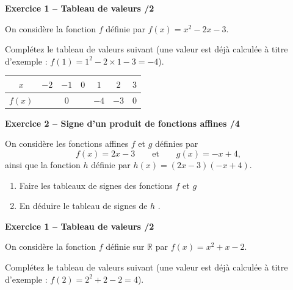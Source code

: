 \documentclass[10pt,a4paper]{article}
\begin{document}



\textbf{Exercice 1 -- Tableau de valeurs \hfill /2}

On considère la fonction \(f\) définie  par \(f(x)=x^2-2x-3\).

Complétez le tableau de valeurs suivant (une valeur est déjà calculée à titre d'exemple : \(f(1)=1^2-2\times 1-3=-4\)).

\begin{center}
    \renewcommand{\arraystretch}{1.5}
    \setlength{\tabcolsep}{0.25cm}
    \begin{tabular}{|*{7}{c|}}
    \hline
    \(x\) & \(-2\) & \(-1\) & \(0\) & \(1\) & \(2\) & \(3\) \\
    \hline
    \(f(x)\) & & \(0\) & & \(-4\) & \(-3\) & \(0\) \\
    \hline
    \end{tabular}
\end{center}


\textbf{Exercice 2 -- Signe d'un produit de fonctions affines \hfill /4}

On considère les fonctions affines \(f\) et \(g\) définies par
\[
f(x)=2x-3 \qquad\text{et}\qquad g(x)=-x+4,
\]
ainsi que la fonction \(h\) définie  par \(h(x)=(2x-3)(-x+4)\).

\begin{enumerate}
\item Faire les tableaux de signes des fonctions \(f\) et \(g\)

\vspace{6cm}

\item En déduire le tableau de signes de \(h\) .

\vspace{4cm}

\end{enumerate}

\text{ }
\newpage


\textbf{Exercice 1 -- Tableau de valeurs \hfill /2}

On considère la fonction \(f\) définie sur \(\mathbb{R}\) par \(f(x)=x^2+x-2\).

Complétez le tableau de valeurs suivant (une valeur est déjà calculée à titre d'exemple : \(f(2)=2^2+2-2=4\)).
\end{document}
